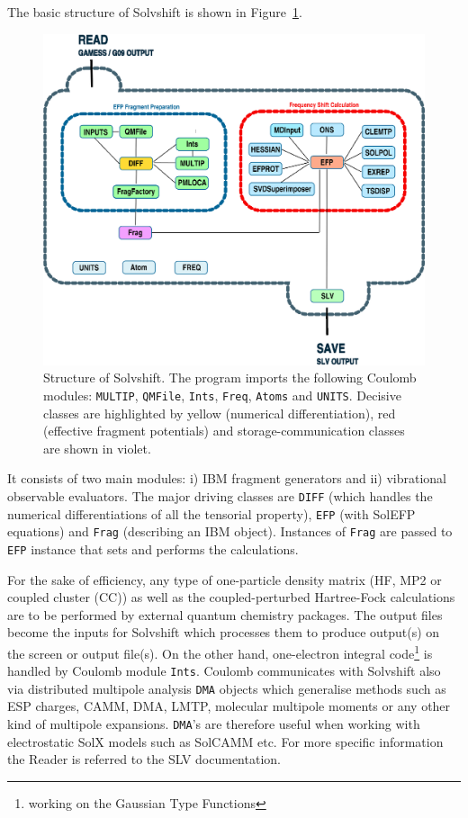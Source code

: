 \documentclass[b5paper,oneside,fleqn,11pt]{book}
\begin{document}
\begin{refsection}
The basic structure of {\sc Solvshift} is shown
in Figure~\ref{f:slv-structure}.
%
\begin{figure}[t!]
\centering
\setlength\fboxsep{0.4pt}
\setlength\fboxrule{0.5pt}
\includegraphics[width=0.90\linewidth]{slv-diagram.eps}
\caption{
Structure of {\sc Solvshift}. The program imports the following 
{\sc Coulomb} modules: {\tt MULTIP}, {\tt QMFile}, {\tt Ints}, 
{\tt Freq}, {\tt Atoms} and {\tt UNITS}. Decisive classes
are highlighted by yellow (numerical differentiation), 
red (effective fragment potentials) and storage\hyp{}communication
classes are shown in violet.
\label{f:slv-structure}}
\end{figure}
%
It consists of two main modules: i) IBM fragment generators 
and ii) vibrational observable evaluators. The major driving classes
are {\tt DIFF} (which handles the numerical differentiations of
all the tensorial property), {\tt EFP} (with SolEFP equations)
and {\tt Frag} (describing an IBM object). Instances of {\tt Frag} are passed to
{\tt EFP} instance that sets and performs the calculations.

For the sake of efficiency, any type of one\hyp{}particle
density matrix (HF, MP2 or coupled cluster (CC))
as well as the coupled\hyp{}perturbed Hartree\hyp{}Fock calculations
are to be performed by external quantum chemistry packages.
The output files become the inputs for {\sc Solvshift}
which
processes them to produce output(s) on the screen
or output file(s).
On the other hand, one\hyp{}electron integral 
code\footnote{working on
the Gaussian Type Functions} is handled by {\sc Coulomb}
module \verb+Ints+. {\sc Coulomb} communicates with {\sc Solvshift}
also via distributed multipole analysis \verb+DMA+ objects which generalise
methods such as ESP charges, CAMM, DMA, LMTP, molecular multipole
moments or any other kind of multipole expansions. 
\verb+DMA+'s are therefore useful when working with
electrostatic SolX models such as SolCAMM etc.
For more specific information the Reader is referred 
to the SLV documentation.


\end{refsection}
\end{document}
